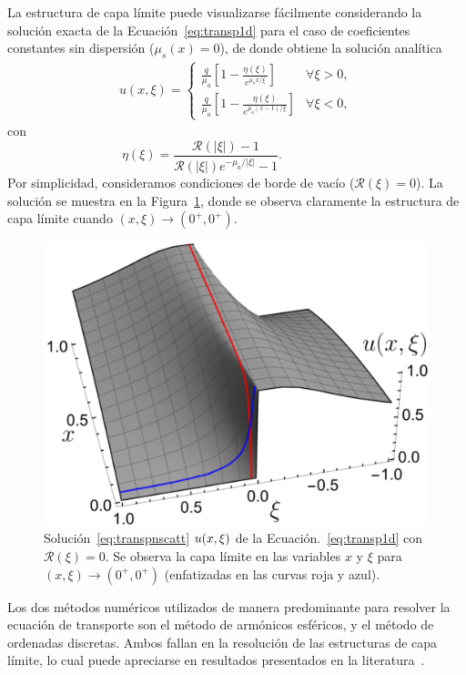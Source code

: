 La estructura de capa límite puede visualizarse fácilmente 
considerando la solución exacta de la Ecuación~\eqref{eq:transp1d} 
para el caso de coeficientes constantes sin dispersión ($\mu_s(x)=0$), 
de donde obtiene la solución analítica 
\begin{equation}
\begin{split}
u(x,\xi)=\begin{cases}
\displaystyle \frac{q}{\mu_a}\left[1-\frac{\eta(\xi)}{ e^{\mu_a x / \xi}}\right]&\forall\xi>0,\\[8pt]
\displaystyle  \frac{q}{\mu_a}\left[1- \frac{\eta(\xi)}{e^{\mu_a (x-1) / \xi}} \right]&\forall\xi<0,
\end{cases}
\end{split}
\label{eq:transpnscatt}
\end{equation}
con
\begin{equation*}
\;\;\eta(\xi)=\frac{\mathcal{R}(|\xi|)-1}{\mathcal{R}(|\xi|)e^{-\mu_a/|\xi|}-1}.\qquad\qquad\qquad
\end{equation*}
Por simplicidad, consideramos condiciones de borde de vacío ($\mathcal{R}(\xi)=0$).
La solución se muestra en la Figura~\ref{fig:ansol}, donde se observa claramente la estructura de capa 
límite cuando $(x,\xi) \to (0^+,0^+)$.
\begin{figure}[h!]
\centering
  \includegraphics[width=0.5\linewidth]{figuras/Analytic_lay_3.pdf}
  \caption{Solución~\eqref{eq:transpnscatt} $u(x,\xi)$ de la Ecuación.~\eqref{eq:transp1d} con
  $\mathcal{R}(\xi)=0$. Se observa la capa límite en las variables $x$ y $\xi$ 
  para $(x,\xi) \to (0^+,0^+)$ (enfatizadas en las curvas roja y azul).}
 \label{fig:ansol}
\end{figure}

Los dos métodos numéricos utilizados de manera predominante 
para resolver la ecuación de transporte son 
el método de armónicos esféricos,  
y el método de ordenadas discretas. Ambos fallan 
en la resolución de las estructuras de capa límite, 
lo cual puede apreciarse en resultados presentados 
en la literatura~\cite{Rocheleau2020,Wang2019,Harel2020,Anli2006,Chai1993}.

